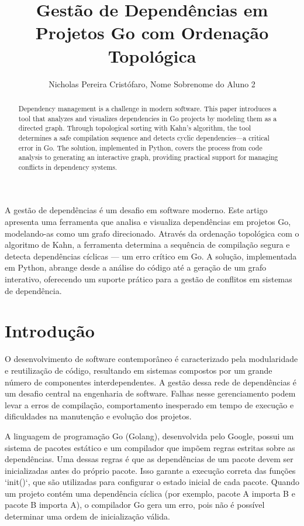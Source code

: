 \documentclass[12pt]{article}
\title{Gestão de Dependências em Projetos Go com Ordenação Topológica}
\author{Nicholas Pereira Cristófaro\inst{1}, Nome Sobrenome do Aluno 2\inst{1}}
\begin{document}
 

\maketitle

\begin{resumo} 
A gestão de dependências é um desafio em software moderno. Este artigo apresenta uma ferramenta que analisa e visualiza dependências em projetos Go, modelando-as como um grafo direcionado. Através da ordenação topológica com o algoritmo de Kahn, a ferramenta determina a sequência de compilação segura e detecta dependências cíclicas — um erro crítico em Go. A solução, implementada em Python, abrange desde a análise do código até a geração de um grafo interativo, oferecendo um suporte prático para a gestão de conflitos em sistemas de dependência.
\end{resumo}

\begin{abstract}
Dependency management is a challenge in modern software. This paper introduces a tool that analyzes and visualizes dependencies in Go projects by modeling them as a directed graph. Through topological sorting with Kahn's algorithm, the tool determines a safe compilation sequence and detects cyclic dependencies—a critical error in Go. The solution, implemented in Python, covers the process from code analysis to generating an interactive graph, providing practical support for managing conflicts in dependency systems.
\end{abstract}

\section{Introdução}

O desenvolvimento de software contemporâneo é caracterizado pela modularidade e reutilização de código, resultando em sistemas compostos por um grande número de componentes interdependentes. A gestão dessa rede de dependências é um desafio central na engenharia de software. Falhas nesse gerenciamento podem levar a erros de compilação, comportamento inesperado em tempo de execução e dificuldades na manutenção e evolução dos projetos.

A linguagem de programação Go (Golang), desenvolvida pelo Google, possui um sistema de pacotes estático e um compilador que impõem regras estritas sobre as dependências. Uma dessas regras é que as dependências de um pacote devem ser inicializadas antes do próprio pacote. Isso garante a execução correta das funções `init()`, que são utilizadas para configurar o estado inicial de cada pacote. Quando um projeto contém uma dependência cíclica (por exemplo, pacote A importa B e pacote B importa A), o compilador Go gera um erro, pois não é possível determinar uma ordem de inicialização válida.
\end{document}
